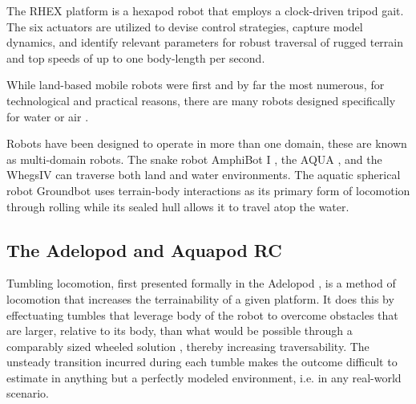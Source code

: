 
		The RHEX platform \cite{Saranli2001a} is a hexapod robot that employs a clock-driven tripod gait. The six actuators are utilized to devise control strategies, capture model dynamics, and identify relevant parameters for robust traversal of rugged terrain and top speeds of up to one body-length per second. %

		While land-based mobile robots were first and by far the most numerous, for technological and practical reasons, there are many robots designed specifically for water \cite{Villanueva2013} \cite{Yu2018} or air \cite{Neumann2012} \cite{Morton2013}.  
		
		Robots have been designed to operate in more than one domain, these are known as multi-domain robots. The snake robot AmphiBot I \cite{Crespi2005a}, the AQUA \cite{Dudek2007}, and the Whegs\texttrademark IV \cite{Boxerbaum2005} can traverse both land and water environments. The aquatic spherical robot Groundbot \cite{Kaznov2010} uses terrain-body interactions as its primary form of locomotion through rolling while its sealed hull allows it to travel atop the water.

	
	\subsection{The Adelopod and Aquapod RC}
	\label{sec:adelopod_aquapodrc}


		Tumbling locomotion, first presented formally in the Adelopod \cite{Hemes2009}, is a method of locomotion that increases the terrainability of a given platform. It does this by effectuating tumbles that leverage body of the robot to overcome obstacles that are larger, relative to its body, than what would be possible through a comparably sized wheeled solution \cite{Hemes2011}, thereby increasing traversability. The unsteady transition incurred during each tumble makes the outcome difficult to estimate in anything but a perfectly modeled environment, i.e. in any real-world scenario. 
		
